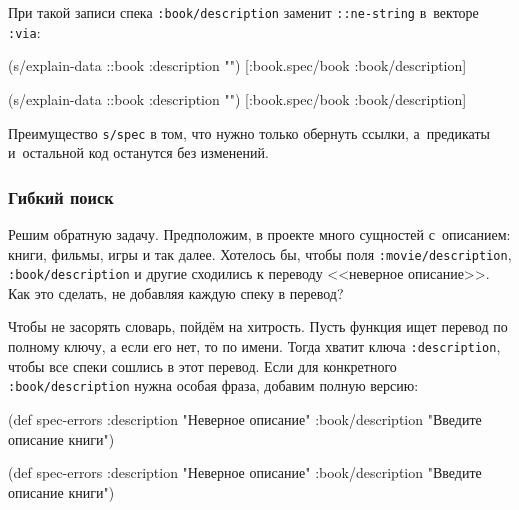 \fi

При такой записи спека \verb|:book/description| заменит \verb|::ne-string|
в~векторе \verb|:via|:

\ifx\DEVICETYPE\MOBILE

\begin{english}
  \begin{clojure}
(s/explain-data ::book
  {:description ""})
[:book.spec/book :book/description]
  \end{clojure}
\end{english}

\else

\begin{english}
  \begin{clojure}
(s/explain-data ::book {:description ""})
[:book.spec/book :book/description]
  \end{clojure}
\end{english}

\fi

Преимущество \verb|s/spec| в том, что нужно только обернуть ссылки, а~предикаты
и~остальной код останутся без изменений.

\subsubsection{Гибкий поиск}

Решим обратную задачу. Предположим, в проекте много сущностей с~описанием:
книги, фильмы, игры и так далее. Хотелось бы, чтобы поля
\verb|:movie/description|, \texttt{:book/descrip\-tion} и другие сходились к
переводу <<неверное описание>>. Как это сделать, не добавляя каждую спеку в
перевод?

Чтобы не засорять словарь, пойдём на хитрость. Пусть функция ищет перевод по
полному ключу, а если его нет, то по имени. Тогда хватит ключа
\verb|:description|, чтобы все спеки сошлись в этот перевод. Если для
конкретного \verb|:book/description| нужна особая фраза, добавим полную
версию:

\ifx\DEVICETYPE\MOBILE

  \begin{clojure}
(def spec-errors
  {:description
   "Неверное описание"
   :book/description
   "Введите описание книги"})
  \end{clojure}

\else

  \begin{clojure}
(def spec-errors
  {:description "Неверное описание"
   :book/description "Введите описание книги"})
  \end{clojure}

